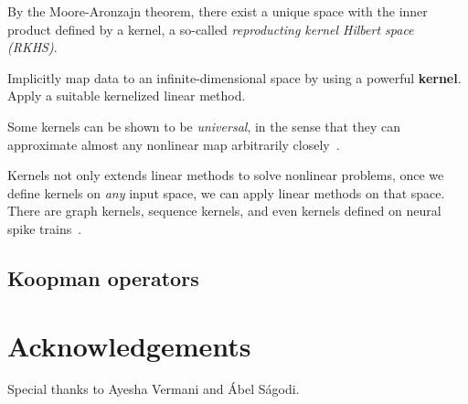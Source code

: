 \documentclass[a4paper,11pt]{exam}
\newcounter{ct}
\begin{document}
\begin{questions}
By the Moore-Aronzajn theorem\citep{Aronszajn1950}, there exist a unique space with the inner product defined by a kernel, a so-called \emph{reproducting kernel Hilbert space (RKHS)}.

\begin{tcolorbox}[colback=black!1!,title=Kernel Trick!]
Implicitly map data to an infinite-dimensional space by using a powerful \textbf{kernel}.
Apply a suitable kernelized linear method.
\end{tcolorbox}

Some kernels can be shown to be \emph{universal}, in the sense that they can approximate almost any nonlinear map arbitrarily closely~\citep{Scholkopf2002}.

Kernels not only extends linear methods to solve nonlinear problems, once we define kernels on \emph{any} input space, we can apply linear methods on that space.
There are graph kernels, sequence kernels, and even kernels defined on neural spike trains~\citep{Park2012a,Park2013a}.

\subsection{Koopman operators}

\end{questions}

\newpage
\section*{Acknowledgements}
Special thanks to Ayesha Vermani and \'Abel S\'agodi.



\end{document}
